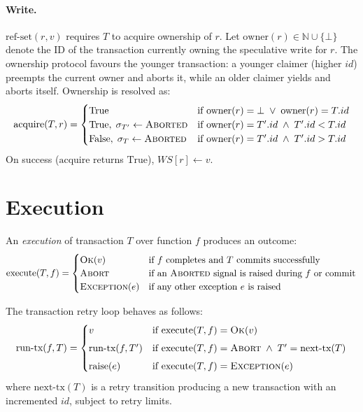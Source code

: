 \paragraph{Write.}
$\text{ref-set}(r, v)$ requires $T$ to acquire ownership of $r$.
Let $\text{owner}(r) \in \mathbb{N} \cup \{ \bot \}$ denote the ID of the
transaction currently owning the speculative write for $r$.
The ownership protocol favours the younger transaction: a younger claimer
(higher $id$) preempts the current owner and aborts it, while an older claimer
yields and aborts itself. Ownership is resolved as:
\[
  \text{acquire}(T, r) =
  \begin{cases}
    \text{True}
     & \text{if } \text{owner}(r) = \bot \;\lor\; \text{owner}(r) = T.id \\
    \text{True},\; \sigma_{T'} \gets \textsc{Aborted}
     & \text{if } \text{owner}(r) = T'.id \;\land\; T'.id < T.id         \\
    \text{False},\; \sigma_{T} \gets \textsc{Aborted}
     & \text{if } \text{owner}(r) = T'.id \;\land\; T'.id > T.id
  \end{cases}
\]
On success ($\text{acquire}$ returns $\text{True}$), $WS[r] \gets v$.

\section{Execution}

An \emph{execution} of transaction $T$ over function $f$ produces an outcome:
\[
  \text{execute}(T, f) =
  \begin{cases}
    \textsc{Ok}(v)
     & \text{if } f \text{ completes and } T \text{ commits successfully}                  \\
    \textsc{Abort}
     & \text{if an } \textsc{Aborted} \text{ signal is raised during } f \text{ or commit} \\
    \textsc{Exception}(e)
     & \text{if any other exception } e \text{ is raised}
  \end{cases}
\]

The transaction retry loop behaves as follows:
\[
  \text{run-tx}(f, T) =
  \begin{cases}
    v
     & \text{if } \text{execute}(T,f) = \textsc{Ok}(v)                                  \\[4pt]
    \text{run-tx}(f, T')
     & \text{if } \text{execute}(T,f) = \textsc{Abort} \;\land\; T' = \text{next-tx}(T) \\[4pt]
    \text{raise}(e)
     & \text{if } \text{execute}(T,f) = \textsc{Exception}(e)
  \end{cases}
\]
where $\text{next-tx}(T)$ is a retry transition producing a new transaction
with an incremented $id$, subject to retry limits.

